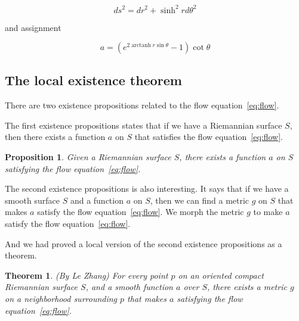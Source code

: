 \documentclass{article}
\numberwithin{definition}{section}
\numberwithin{lemma}{section}
\newtheorem{proposition}{Proposition}
\numberwithin{proposition}{section}
\numberwithin{corollary}{section}
\newtheorem{theorem}{Theorem}
\numberwithin{theorem}{section}
\DeclareMathOperator{\arctanh}{arctanh}
\begin{document}
\[
    ds^2 = dr^2 + \sinh^2 r d\theta^2
\]

and assignment

\[
    a = (e^{2 \arctanh r \sin \theta} -  1) \cot \theta
\]

\subsection{The local existence theorem}\label{subsec:existence-theorems}

There are two existence propositions related to the flow equation~\eqref{eq:flow}.

The first existence propositions states that if we have a Riemannian surface $S$, then there exists a function $a$ on $S$ that satisfies the flow equation~\eqref{eq:flow}.

\begin{proposition}
    Given a Riemannian surface $S$, there exists a function $a$ on $S$ satisfying the flow equation~\eqref{eq:flow}.
    \label{prop:existence1st}
\end{proposition}

The second existence propositions is also interesting.
It says that if we have a smooth surface $S$ and a function $a$ on $S$, then we can find a metric $g$ on $S$ that makes $a$ satisfy the flow equation~\eqref{eq:flow}.
We morph the metric $g$ to make $a$ satisfy the flow equation~\eqref{eq:flow}.

And we had proved a local version of the second existence propositions as a theorem.
\begin{theorem}(By Le Zhang)
    For every point \( p \) on an oriented compact Riemannian surface $S$, and a smooth function $a$ over $S$, there exists a metric $g$ on a neighborhood surrounding \( p \)
    that makes $a$ satisfying the flow equation~\eqref{eq:flow}.
    \label{prop:existence2nd}
\end{theorem}
\end{document}
